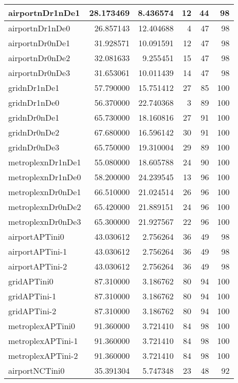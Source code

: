 \documentclass[../../../thesis.tex]{subfiles}
\begin{document}
\begin{longtable}{|l|r|r|r|r|r|}
\endlastfoot
airportnDr1nDe1 & 28.173469 & 8.436574 & 12 & 44 & 98 \\ \hline
airportnDr1nDe0 & 26.857143 & 12.404688 & 4 & 47 & 98 \\ \hline
airportnDr0nDe1 & 31.928571 & 10.091591 & 12 & 47 & 98 \\ \hline
airportnDr0nDe2 & 32.081633 & 9.255451 & 15 & 47 & 98 \\ \hline
airportnDr0nDe3 & 31.653061 & 10.011439 & 14 & 47 & 98 \\ \hline
gridnDr1nDe1 & 57.790000 & 15.751412 & 27 & 85 & 100 \\ \hline
gridnDr1nDe0 & 56.370000 & 22.740368 & 3 & 89 & 100 \\ \hline
gridnDr0nDe1 & 65.730000 & 18.160816 & 27 & 91 & 100 \\ \hline
gridnDr0nDe2 & 67.680000 & 16.596142 & 30 & 91 & 100 \\ \hline
gridnDr0nDe3 & 65.750000 & 19.310004 & 29 & 89 & 100 \\ \hline
metroplexnDr1nDe1 & 55.080000 & 18.605788 & 24 & 90 & 100 \\ \hline
metroplexnDr1nDe0 & 58.200000 & 24.239545 & 13 & 96 & 100 \\ \hline
metroplexnDr0nDe1 & 66.510000 & 21.024514 & 26 & 96 & 100 \\ \hline
metroplexnDr0nDe2 & 65.420000 & 21.889151 & 24 & 96 & 100 \\ \hline
metroplexnDr0nDe3 & 65.300000 & 21.927567 & 22 & 96 & 100 \\ \hline
airportAPTini0 & 43.030612 & 2.756264 & 36 & 49 & 98 \\ \hline
airportAPTini-1 & 43.030612 & 2.756264 & 36 & 49 & 98 \\ \hline
airportAPTini-2 & 43.030612 & 2.756264 & 36 & 49 & 98 \\ \hline
gridAPTini0 & 87.310000 & 3.186762 & 80 & 94 & 100 \\ \hline
gridAPTini-1 & 87.310000 & 3.186762 & 80 & 94 & 100 \\ \hline
gridAPTini-2 & 87.310000 & 3.186762 & 80 & 94 & 100 \\ \hline
metroplexAPTini0 & 91.360000 & 3.721410 & 84 & 98 & 100 \\ \hline
metroplexAPTini-1 & 91.360000 & 3.721410 & 84 & 98 & 100 \\ \hline
metroplexAPTini-2 & 91.360000 & 3.721410 & 84 & 98 & 100 \\ \hline
airportNCTini0 & 35.391304 & 5.747348 & 23 & 48 & 92 \\ \hline

\end{longtable}
\end{document}
